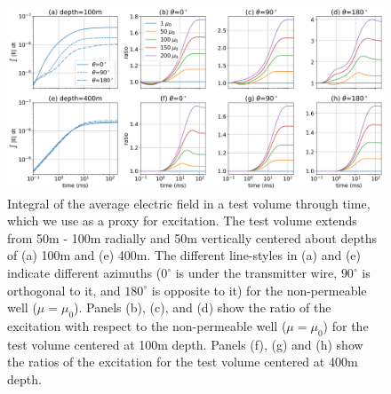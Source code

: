 \begin{figure}
    \begin{center}
    \includegraphics[width=\textwidth]{figures/excitation-time-integrated.png}
    \end{center}
\caption{
    Integral of the average electric field in a test volume through time, which we use as a proxy for excitation. The test volume extends from 50m - 100m radially and 50m vertically centered about depths of (a) 100m and (e) 400m. The different line-styles in (a) and (e) indicate different azimuths ($0^\circ$ is under the transmitter wire, $90^\circ$ is orthogonal to it, and $180^\circ$ is opposite to it) for the non-permeable well ($\mu=\mu_0$). Panels (b), (c), and (d) show the ratio of the excitation with respect to the non-permeable well ($\mu=\mu_0$) for the test volume centered at 100m depth. Panels (f), (g) and (h) show the ratios of the excitation for the test volume centered at 400m depth.
}
\label{fig:excitation-time-integrated}
\end{figure}



